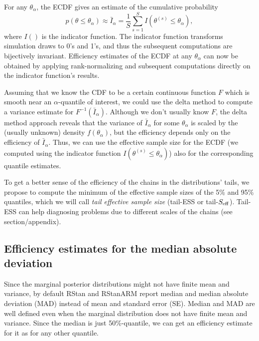 \documentclass[american,]{article}
\begin{document}
For any \(\theta_\alpha\), the ECDF gives an estimate of the cumulative
probability
\begin{equation}
p(\theta \leq \theta_\alpha) \approx \bar{I}_\alpha = \frac{1}{S}\sum_{s=1}^S
I(\theta^{(s)} \leq\theta_\alpha),
\end{equation}
where \(I()\) is the indicator function. The indicator function
transforms simulation draws to 0's and 1's, and thus the subsequent
computations are bijectively invariant. Efficiency estimates of the ECDF
at any \(\theta_\alpha\) can now be obtained by applying
rank-normalizing and subsequent computations directly on the indicator
function's results.

Assuming that we know the CDF to be a certain continuous function \(F\)
which is smooth near an \(\alpha\)-quantile of interest, we could use
the delta method to compute a variance estimate for
\(F^{-1}(\bar{I}_\alpha)\). Although we don't usually know \(F\), the
delta method approach reveals that the variance of \(\bar{I}_\alpha\)
for some \(\theta_\alpha\) is scaled by the (usually unknown) density
\(f(\theta_\alpha)\), but the efficiency depends only on the efficiency
of \(\bar{I}_\alpha\). Thus, we can use the effective sample size for
the ECDF (we computed using the indicator function
\(I(\theta^{(s)} \leq \theta_\alpha)\)) also for the corresponding
quantile estimates.

To get a better sense of the efficiency of the chains in the
distributions' tails, we propose to compute the minimum of the effective
sample sizes of the 5\% and 95\% quantiles, which we will call
\emph{tail effective sample size} (tail-ESS or tail-\(S_{\rm eff}\)).
Tail-ESS can help diagnosing problems due to different scales of the
chains (see section/appendix).


\hypertarget{efficiency-estimates-for-the-median-absolute-deviation}{%
\subsection{Efficiency estimates for the median absolute
deviation}\label{efficiency-estimates-for-the-median-absolute-deviation}}

Since the marginal posterior distributions might not have finite mean
and variance, by default RStan \citep{RStan.2.17} and RStanARM
\citep{RStanARM.2.17} report median and median absolute deviation (MAD)
instead of mean and standard error (SE). Median and MAD are well defined
even when the marginal distribution does not have finite mean and
variance. Since the median is just 50\%-quantile, we can get an
efficiency estimate for it as for any other quantile.
\end{document}
